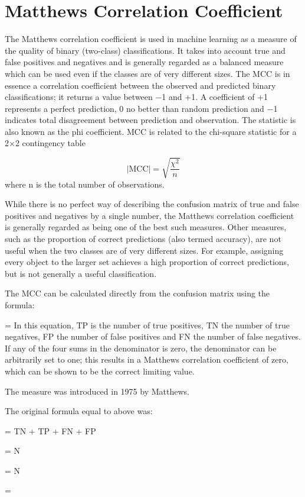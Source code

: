 \section{Matthews Correlation Coefficient}
The Matthews correlation coefficient is used in machine learning as a measure of the quality of binary (two-class) classifications. It takes into account true and false positives and negatives and is generally regarded as a balanced measure which can be used even if the classes are of very different sizes. The MCC is in essence a correlation coefficient between the observed and predicted binary classifications; it returns a value between −1 and +1. A coefficient of +1 represents a perfect prediction, 0 no better than random prediction and −1 indicates total disagreement between prediction and observation. The statistic is also known as the phi coefficient. MCC is related to the chi-square statistic for a 2×2 contingency table

\[ |\text{MCC}| = \sqrt{\frac{\chi^2}{n}}\]
where n is the total number of observations.

While there is no perfect way of describing the confusion matrix of true and false positives and negatives by a single number, the Matthews correlation coefficient is generally regarded as being one of the best such measures. Other measures, such as the proportion of correct predictions (also termed accuracy), are not useful when the two classes are of very different sizes. For example, assigning every object to the larger set achieves a high proportion of correct predictions, but is not generally a useful classification.

The MCC can be calculated directly from the confusion matrix using the formula:


 =  { }
In this equation, TP is the number of true positives, TN the number of true negatives, FP the number of false positives and FN the number of false negatives. If any of the four sums in the denominator is zero, the denominator can be arbitrarily set to one; this results in a Matthews correlation coefficient of zero, which can be shown to be the correct limiting value.

The measure was introduced in 1975 by Matthews. 


The original formula equal to above was:


  = TN + TP + FN + FP

 =  { N }

 =  { N }

 =  { }
